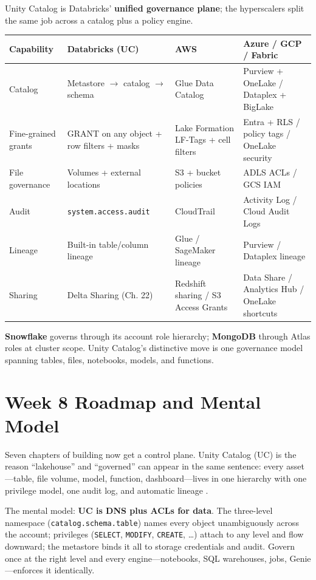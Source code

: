 \begin{crosscloud}
Unity Catalog is Databricks' \textbf{unified governance plane}; the hyperscalers split the same
job across a catalog plus a policy engine.

\vspace{2mm}
{\footnotesize
\begin{tabular}{@{}p{3.0cm}p{3.4cm}p{3.2cm}p{3.2cm}@{}}
\toprule
\textbf{Capability} & \textbf{Databricks (UC)} & \textbf{AWS} & \textbf{Azure / GCP / Fabric} \\
\midrule
Catalog & Metastore $\rightarrow$ catalog $\rightarrow$ schema & Glue Data Catalog & Purview + OneLake / Dataplex + BigLake \\
Fine-grained grants & GRANT on any object + row filters + masks & Lake Formation LF-Tags + cell filters & Entra + RLS / policy tags / OneLake security \\
File governance & Volumes + external locations & S3 + bucket policies & ADLS ACLs / GCS IAM \\
Audit & \texttt{system.access.audit} & CloudTrail & Activity Log / Cloud Audit Logs \\
Lineage & Built-in table/column lineage & Glue / SageMaker lineage & Purview / Dataplex lineage \\
Sharing & Delta Sharing (Ch. 22) & Redshift sharing / S3 Access Grants & Data Share / Analytics Hub / OneLake shortcuts \\
\bottomrule
\end{tabular}}

\vspace{1mm}
\textbf{Snowflake} governs through its account role hierarchy; \textbf{MongoDB} through Atlas
roles at cluster scope. Unity Catalog's distinctive move is one governance model spanning tables,
files, notebooks, models, and functions.
\end{crosscloud}

\section{Week 8 Roadmap and Mental Model}
Seven chapters of building now get a control plane. Unity Catalog (UC) is the reason ``lakehouse'' and ``governed'' can appear in the same sentence: every asset---table, file volume, model, function, dashboard---lives in one hierarchy with one privilege model, one audit log, and automatic lineage \cite{databricksUnityCatalog}.

The mental model: \textbf{UC is DNS plus ACLs for data}. The three-level namespace (\texttt{catalog.schema.table}) names every object unambiguously across the account; privileges (\texttt{SELECT}, \texttt{MODIFY}, \texttt{CREATE}, \dots) attach to any level and flow downward; the metastore binds it all to storage credentials and audit. Govern once at the right level and every engine---notebooks, SQL warehouses, jobs, Genie---enforces it identically.

